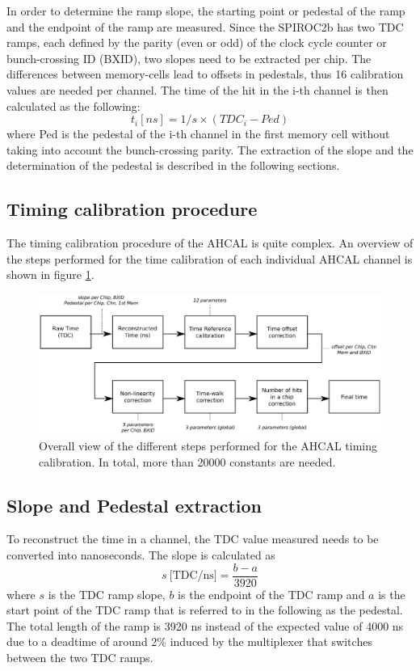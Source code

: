 \documentclass{JINST}
\begin{document}
In order to determine the ramp slope, the starting point or pedestal of the ramp and the endpoint of the ramp are measured. Since the SPIROC2b has two TDC ramps, each defined by the parity (even or odd) of the clock cycle counter or bunch-crossing ID (BXID), two slopes need to be extracted per chip. The differences between memory-cells lead to offsets in pedestals, thus 16 calibration values are needed per channel. The time of the hit in the i-th channel is then calculated as the following:
\begin{equation}
  t_{i} [ns] = 1/s \times (TDC_{i} - Ped)
\end{equation}
where Ped is the pedestal of the i-th channel in the first memory cell without taking into account the bunch-crossing parity. The extraction of the slope and the determination of the pedestal is described in the following sections.

\subsection{Timing calibration procedure}

The timing calibration procedure of the AHCAL is quite complex. An overview of the steps performed for the time calibration of each individual AHCAL channel is shown in figure \ref{fig:CalibOverview}.

\begin{figure}[htbp!]
  \centering
  \includegraphics[width=1\linewidth]{fig/TimeCalibOverview.eps}
  \caption{Overall view of the different steps performed for the AHCAL timing calibration. In total, more than 20000 constants are needed.} \label{fig:CalibOverview}
\end{figure}

\subsection{Slope and Pedestal extraction}

To reconstruct the time in a channel, the TDC value measured needs to be converted into nanoseconds. The slope is calculated as
\begin{equation} \label{eq:slope}
  s \: \text{[TDC/ns]} = \frac{b - a}{3920}
\end{equation}
where $s$ is the TDC ramp slope, $b$ is the endpoint of the TDC ramp and $a$ is the start point of the TDC ramp that is referred to in the following as the pedestal. The total length of the ramp is 3920 ns instead of the expected value of 4000 ns due to a deadtime of around 2\% \cite{Brianne2012} induced by the multiplexer that switches between the two TDC ramps.
\end{document}
